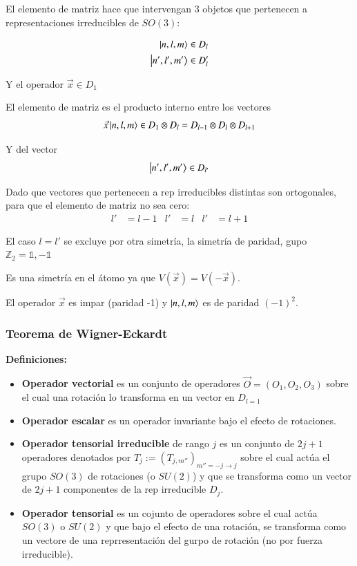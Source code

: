 El elemento de matriz hace que intervengan 3 objetos que pertenecen a representaciones irreducibles de $SO(3)$:

\begin{align*}
    \ket{n,l,m}&\in D_l\\
    \ket{n',l',m'}&\in D_l'\\
\end{align*}

Y el operador $\vec{x}\in D_1$

El elemento de matriz es el producto interno entre los vectores $$\vec{x}\ket{n,l,m}\in D_1\otimes D_l=D_{l-1}\otimes D_{l}\otimes D_{l+1}$$

Y del vector
$$ \ket{n',l',m'}\in D_{l'}$$

Dado que vectores que pertenecen a rep irreducibles distintas son ortogonales, para que el elemento de matriz no sea cero:
\begin{align*}
    l'&=l-1&l'&=l&l'&=l+1
\end{align*}

El caso $l=l'$ se excluye por otra simetría, la simetría de paridad, gupo $\mathbb{Z}_2={\mathbb{1,-1}}$

Es una simetría en el átomo ya que $V(\vec{x})=V(-\vec{x})$.

El operador $\vec{x}$ es impar (paridad -1) y $\ket{n,l,m}$ es de paridad $(-1)^2$.

\subsubsection{Teorema de Wigner-Eckardt}

\textbf{Definiciones:}

\begin{itemize}
    \item \textbf{Operador vectorial} es un conjunto de operadores $\vec{O}=(O_1,O_2,O_3)$ sobre el cual una rotación lo transforma en un vector en $D_{l=1}$
    \item \textbf{Operador escalar} es un operador invariante bajo el efecto de rotaciones.
    \item \textbf{Operador tensorial irreducible} de rango $j$ es un conjunto de $2j+1$ operadores denotados por $T_j:=(T_{j,m''})_{m''=-j\rightarrow j}$ sobre el cual actúa el grupo $SO(3)$ de rotaciones (o $SU(2)$) y que se transforma como un vector de $2j+1$ componentes de la rep irreducible $D_j$.
    \item \textbf{Operador tensorial} es un cojunto de operadores sobre el cual actúa $SO(3)$ o $SU(2)$ y que bajo el efecto de una rotación, se transforma como un vectore de una reprresentación del gurpo de rotación (no por fuerza irreducible).
\end{itemize}


